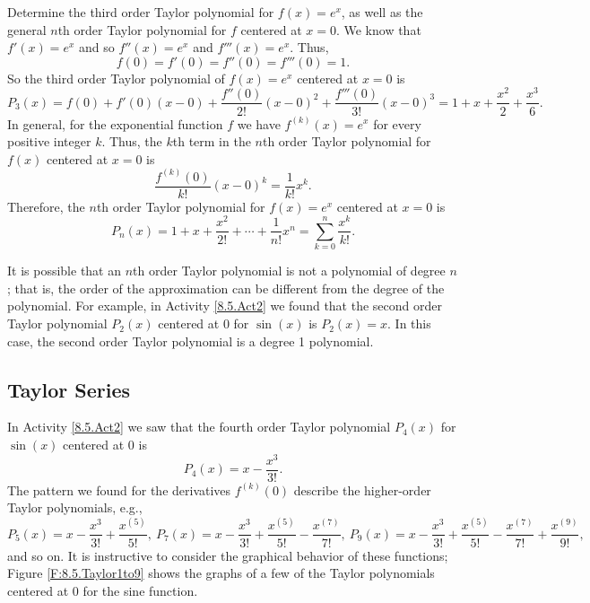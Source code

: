 


\bex \label{Ex:8.5.1}
Determine the third order Taylor polynomial for $f(x) = e^x$, as well as the general $n$th order Taylor polynomial for $f$ centered at $x=0$.
\eex
We know that $f'(x) = e^x$ and so $f''(x) = e^x$ and $f'''(x) = e^x$. Thus,
\[f(0) = f'(0) = f''(0) = f'''(0) = 1.\]
So the third order Taylor polynomial of $f(x) = e^x$ centered at $x=0$ is
\[P_3(x) = f(0) + f'(0)(x-0) + \frac{f''(0)}{2!}(x-0)^2 + \frac{f'''(0)}{3!}(x-0)^3 = 1 + x + \frac{x^2}{2} + \frac{x^3}{6}.\]
In general, for the exponential function $f$ we have $f^{(k)}(x) = e^x$ for every positive integer $k$. Thus, the $k$th term in the $n$th order Taylor polynomial for $f(x)$ centered at $x=0$ is
\[\frac{f^{(k)}(0)}{k!}(x-0)^k = \frac{1}{k!}x^k.\]
Therefore, the $n$th order Taylor polynomial for $f(x) = e^x$ centered at $x=0$ is
\[P_n(x) = 1+x+\frac{x^2}{2!} + \cdots + \frac{1}{n!}x^n = \sum_{k=0}^n \frac{x^k}{k!}.\]
\afterex



It is possible that an $n$th order Taylor polynomial is not a polynomial of degree $n$; that is, the order of the approximation can be different from the degree of the polynomial.  For example, in Activity \ref{8.5.Act2} we found that the second order Taylor polynomial $P_2(x)$ centered at 0 for $\sin(x)$ is $P_2(x) = x$. In this case, the second order Taylor polynomial is a degree 1 polynomial. 

\subsection*{Taylor Series} 

In Activity \ref{8.5.Act2} we saw that the fourth order Taylor polynomial $P_4(x)$ for $\sin(x)$ centered at 0 is
\[P_4(x) = x - \frac{x^3}{3!}.\]
The pattern we found for the derivatives $f^{(k)}(0)$ describe the higher-order Taylor polynomials, e.g.,
\[P_5(x) = x - \frac{x^3}{3!} + \frac{x^{(5)}}{5!}, \ P_7(x) = x - \frac{x^3}{3!} + \frac{x^{(5)}}{5!} - \frac{x^{(7)}}{7!}, \  P_9(x) = x - \frac{x^3}{3!} + \frac{x^{(5)}}{5!} - \frac{x^{(7)}}{7!} + \frac{x^{(9)}}{9!},\]
and so on.  It is instructive to consider the graphical behavior of these functions; Figure \ref{F:8.5.Taylor1to9} shows the graphs of a few of the Taylor polynomials centered at 0 for the sine function.

